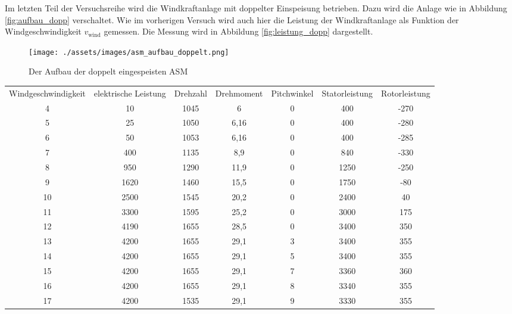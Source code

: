\documentclass{report}
\begin{document}
Im letzten Teil der Versuchsreihe wird die Windkraftanlage mit doppelter Einspeisung betrieben. Dazu wird die Anlage wie in Abbildung \ref{fig:aufbau_dopp} verschaltet. Wie im vorherigen Versuch wird auch hier die Leistung der Windkraftanlage als Funktion der Windgeschwindigkeit $v_{\mathrm{wind}}$ gemessen. Die Messung wird in Abbildung \ref{fig:leistung_dopp} dargestellt.

\begin{figure}[!ht]
	\centering
	\texttt{[image: ./assets/images/asm\_aufbau\_doppelt.png]}
	\caption{Der Aufbau der doppelt eingespeisten ASM}
	\label{fig:asm_aufbau_doppelt}
\end{figure}


\begin{table}[!ht]
	\begin{tabular}{|c|c|c|c|c|c|c|}
		Windgeschwindigkeit & elektrische Leistung & Drehzahl & Drehmoment & Pitchwinkel & Statorleistung & Rotorleistung \\

		4                   & 10                   & 1045     & 6          & 0           & 400            & -270          \\
		5                   & 25                   & 1050     & 6,16       & 0           & 400            & -280          \\
		6                   & 50                   & 1053     & 6,16       & 0           & 400            & -285          \\
		7                   & 400                  & 1135     & 8,9        & 0           & 840            & -330          \\
		8                   & 950                  & 1290     & 11,9       & 0           & 1250           & -250          \\
		9                   & 1620                 & 1460     & 15,5       & 0           & 1750           & -80           \\
		10                  & 2500                 & 1545     & 20,2       & 0           & 2400           & 40            \\
		11                  & 3300                 & 1595     & 25,2       & 0           & 3000           & 175           \\
		12                  & 4190                 & 1655     & 28,5       & 0           & 3400           & 350           \\
		13                  & 4200                 & 1655     & 29,1       & 3           & 3400           & 355           \\
		14                  & 4200                 & 1655     & 29,1       & 5           & 3400           & 355           \\
		15                  & 4200                 & 1655     & 29,1       & 7           & 3360           & 360           \\
		16                  & 4200                 & 1655     & 29,1       & 8           & 3340           & 355           \\
		17                  & 4200                 & 1535     & 29,1       & 9           & 3330           & 355
	\end{tabular}
\end{table}
\end{document}

